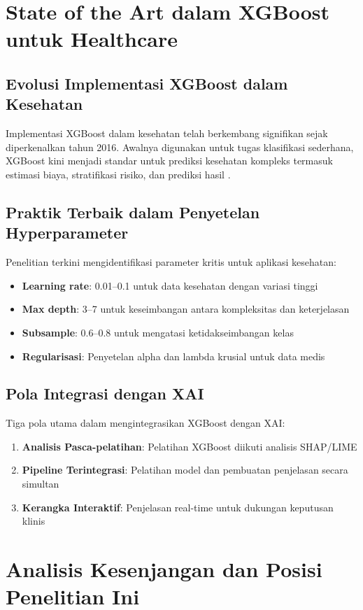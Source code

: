 \section{State of the Art dalam XGBoost untuk Healthcare}

\subsection{Evolusi Implementasi XGBoost dalam Kesehatan}
Implementasi XGBoost dalam kesehatan telah berkembang signifikan sejak diperkenalkan tahun 2016. Awalnya digunakan untuk tugas klasifikasi sederhana, XGBoost kini menjadi standar untuk prediksi kesehatan kompleks termasuk estimasi biaya, stratifikasi risiko, dan prediksi hasil \citep{Zhang2025}.

\subsection{Praktik Terbaik dalam Penyetelan Hyperparameter}
Penelitian terkini mengidentifikasi parameter kritis untuk aplikasi kesehatan:
\begin{itemize}
    \item \textbf{Learning rate}: 0.01–0.1 untuk data kesehatan dengan variasi tinggi
    \item \textbf{Max depth}: 3–7 untuk keseimbangan antara kompleksitas dan keterjelasan
    \item \textbf{Subsample}: 0.6–0.8 untuk mengatasi ketidakseimbangan kelas
    \item \textbf{Regularisasi}: Penyetelan alpha dan lambda krusial untuk data medis
\end{itemize}

\subsection{Pola Integrasi dengan XAI}
Tiga pola utama dalam mengintegrasikan XGBoost dengan XAI:
\begin{enumerate}
    \item \textbf{Analisis Pasca-pelatihan}: Pelatihan XGBoost diikuti analisis SHAP/LIME
    \item \textbf{Pipeline Terintegrasi}: Pelatihan model dan pembuatan penjelasan secara simultan
    \item \textbf{Kerangka Interaktif}: Penjelasan real-time untuk dukungan keputusan klinis
\end{enumerate}

\section{Analisis Kesenjangan dan Posisi Penelitian Ini}

